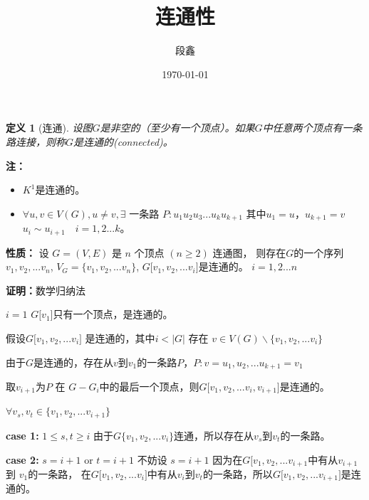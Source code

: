\documentclass[UTF8]{ctexart}
\title{\heiti 1.4 连通性}
\author{\kaishu 段鑫}
\date{\today}
\newtheorem{mydef}{定义}
\begin{document}
       
    \maketitle
     
    \begin{mydef}[连通]
    
    设图$G$是非空的（至少有一个顶点）。如果$G$中任意两个顶点有一条路连接，则称$G$是连通的(connected)。
    
    \end{mydef}
    
    \textbf{注：} 
    
    \begin{itemize}
    
      \item $K^1$是连通的。
      \item  $\forall u , v \in V(G),u \neq v , \exists$ 一条路  $P:u_{ 1 } u_{ 2 } u_{ 3 } ... u_{ k} u_{k+1}$  其中$u_{1}=u$，$u_{k+1}=v$ $u_{ i } \sim u_{i+1}  \quad i=1,2 ...k$。
      
     \end{itemize}
     \textbf{性质：} 设 $ G= ( V, E )$ 是 $n$ 个顶点 $ ( n \geq 2 )$ 连通图，
     则存在$ G $的一个序列$ v_{1}, v_{2},... v_{n}$, $ V_{G} =\lbrace v_{1}, v_{2},... v_{n} \rbrace$, $G\lbrack  v_{1}, v_{2},... v_{i}\rbrack $是连通的。 $ i=1,2 ...n$
    
    \textbf{证明：}数学归纳法
    
    $ i=1$ \qquad $G\lbrack  v_{1} \rbrack $只有一个顶点，是连通的。
    
    
    假设$ G\lbrack  v_{1}, v_{2},... v_{i} \rbrack $ 是连通的，其中$ i <|G| $
    存在  $ v \in V(G) \backslash \lbrace  v_{1}, v_{2},... v_{i} \rbrace $ 
    
    由于$ G $是连通的，存在从$ v $到$v_{1}$的一条路$P$，$P:v= u_{1}, u_{2},... u_{k+1}=v_{1}$
    
    取$ v_{i+1}$为$ P $ 在 $ G-G_{i} $中的最后一个顶点，则$ G\lbrack  v_{1}, v_{2},... v_{i},v_{i+1}\rbrack $是连通的。
    
    $\forall v_{s},v_{t} \in \lbrace  v_{1}, v_{2},... v_{i+1}\rbrace $
    
    \textbf{case 1:} $1\leq s,t\geq i$ 由于$G\lbrace  v_{1}, v_{2},... v_{i}\rbrace $连通，所以存在从$v_{s}$到$v_{t}$的一条路。
    
    \textbf{case 2:} $s=i+1$ or $t=i+1$ 不妨设 $s=i+1$ 因为在$G\lbrack v_{1}, v_{2},... v_{i+1}$中有从$v_{i+1}$ 到 $v_{1}$的一条路，
    在$ G\lbrack  v_{1}, v_{2},... v_{i} \rbrack$中有从$v_{i}$到$v_{t}$的一条路，所以$G\lbrack  v_{1}, v_{2},... v_{i+1}\rbrack$是连通的。
    
\end{document}
